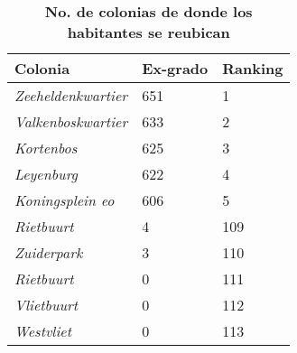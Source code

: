 \def\arraystretch{1.5} %
\begin{table}[H]
\centering
\caption{\textbf{No. de colonias de donde los habitantes se reubican}}
\footnotesize
\centering
\begin{tabular}{p{3cm} p{1.5cm} p{1.5cm}}
\textbf{Colonia} &  \textbf{Ex-grado} & \textbf{Ranking}\\
\hline
\hline 
\textit{Zeeheldenkwartier} & 651 & 1 \\
\textit{Valkenboskwartier} & 633 & 2 \\
\textit{Kortenbos} & 625 & 3 \\
\textit{Leyenburg} & 622 & 4 \\
\textit{Koningsplein eo} & 606 & 5 \\
\textit{Rietbuurt} & 4 & 109 \\
\textit{Zuiderpark} & 3 & 110\\
\textit{Rietbuurt} & 0 & 111\\
\textit{Vlietbuurt} & 0 & 112\\
\textit{Westvliet} & 0 & 113
\addtocounter{footnote}{1}
\end{tabular}

\vspace{2mm}
\label{tab:exgrado}
\end{table}



	
	
	
	
	
